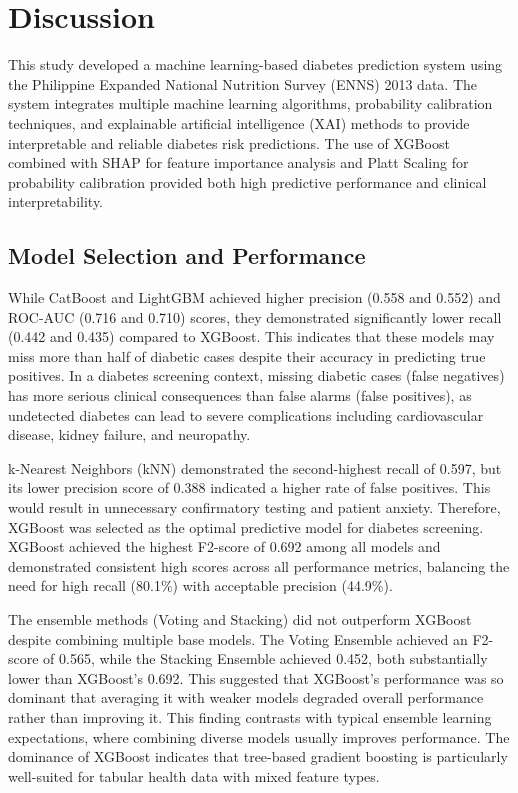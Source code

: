 \section{Discussion}

This study developed a machine learning-based diabetes prediction system using the Philippine Expanded National Nutrition Survey (ENNS) 2013 data. The system integrates multiple machine learning algorithms, probability calibration techniques, and explainable artificial intelligence (XAI) methods to provide interpretable and reliable diabetes risk predictions. The use of XGBoost combined with SHAP for feature importance analysis and Platt Scaling for probability calibration provided both high predictive performance and clinical interpretability.

\subsection{Model Selection and Performance}

While CatBoost and LightGBM achieved higher precision (0.558 and 0.552) and ROC-AUC (0.716 and 0.710) scores, they demonstrated significantly lower recall (0.442 and 0.435) compared to XGBoost. This indicates that these models may miss more than half of diabetic cases despite their accuracy in predicting true positives. In a diabetes screening context, missing diabetic cases (false negatives) has more serious clinical consequences than false alarms (false positives), as undetected diabetes can lead to severe complications including cardiovascular disease, kidney failure, and neuropathy.

k-Nearest Neighbors (kNN) demonstrated the second-highest recall of 0.597, but its lower precision score of 0.388 indicated a higher rate of false positives. This would result in unnecessary confirmatory testing and patient anxiety. Therefore, XGBoost was selected as the optimal predictive model for diabetes screening. XGBoost achieved the highest F2-score of 0.692 among all models and demonstrated consistent high scores across all performance metrics, balancing the need for high recall (80.1\%) with acceptable precision (44.9\%).

The ensemble methods (Voting and Stacking) did not outperform XGBoost despite combining multiple base models. The Voting Ensemble achieved an F2-score of 0.565, while the Stacking Ensemble achieved 0.452, both substantially lower than XGBoost's 0.692. This suggested that XGBoost's performance was so dominant that averaging it with weaker models degraded overall performance rather than improving it. This finding contrasts with typical ensemble learning expectations, where combining diverse models usually improves performance. The dominance of XGBoost indicates that tree-based gradient boosting is particularly well-suited for tabular health data with mixed feature types.

